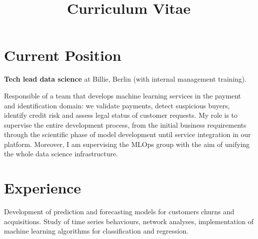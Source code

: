 \documentclass[11pt,a4paper,sans]{moderncv}
\title{Curriculum Vitae}
\begin{document}
\makecvtitle


\section{Current Position} \textbf{Tech lead data science} at Billie, Berlin (with internal management training).

\bigskip Responsible of a team that develops machine learning services in the payment and identification domain: we validate payments, detect suspicious
buyers, identify credit risk and assess legal status of customer requests. My role is to supervise the entire development process, from the initial business requirements through the scientific phase of model development until service integration in our platform. Moreover, I am supervising the MLOps group with the aim of unifying the whole data science infrastructure.

\section{Experience}


 {%
Development of prediction and forecasting models for customers churns and acquisitions. Study of time series behaviours, network analyses, implementation of machine learning algorithms for classification and regression.}

\end{document}
